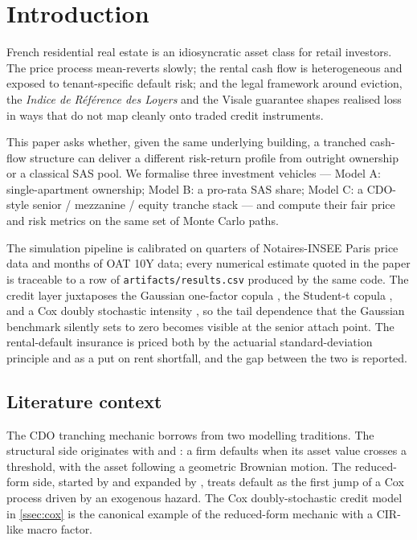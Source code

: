 \section{Introduction}\label{sec:intro}

French residential real estate is an idiosyncratic asset class for
retail investors. The price process mean-reverts slowly; the rental
cash flow is heterogeneous and exposed to tenant-specific default risk;
and the legal framework around eviction, the \textit{Indice de Référence
des Loyers} and the Visale guarantee shapes realised loss in ways that
do not map cleanly onto traded credit instruments.

This paper asks whether, given the same underlying building, a tranched
cash-flow structure can deliver a different risk-return profile from
outright ownership or a classical SAS pool. We formalise three
investment vehicles --- Model A: single-apartment ownership; Model B: a
pro-rata SAS share; Model C: a CDO-style senior / mezzanine / equity
tranche stack --- and compute their fair price and risk metrics on the
same set of Monte Carlo paths.

The simulation pipeline is calibrated on \dataParisN{} quarters of
Notaires-INSEE Paris price data and \dataOatN{} months of OAT 10Y data;
every numerical estimate quoted in the paper is traceable to a row of
\texttt{artifacts/results.csv} produced by the same code. The credit
layer juxtaposes the Gaussian one-factor copula
\autocite{Li2000, Vasicek2002}, the Student-t copula
\autocite{EmbrechtsMcNeilStraumann2002}, and a Cox doubly stochastic
intensity \autocite{DuffieSingleton2003}, so the tail dependence that
the Gaussian benchmark silently sets to zero becomes visible at the
senior attach point. The rental-default insurance is priced both by the
actuarial standard-deviation principle and as a put on rent shortfall,
and the gap between the two is reported.

\subsection{Literature context}

The CDO tranching mechanic borrows from two modelling traditions. The
structural side originates with \autocite{BlackScholes1973} and
\autocite{Merton1976}: a firm defaults when its asset value crosses a
threshold, with the asset following a geometric Brownian motion. The
reduced-form side, started by \autocite{DuffieSingleton2003} and
expanded by \autocite{Schonbucher2003}, treats default as the first
jump of a Cox process driven by an exogenous hazard. The Cox
doubly-stochastic credit model in \cref{ssec:cox} is the canonical
example of the reduced-form mechanic with a CIR-like macro factor.

